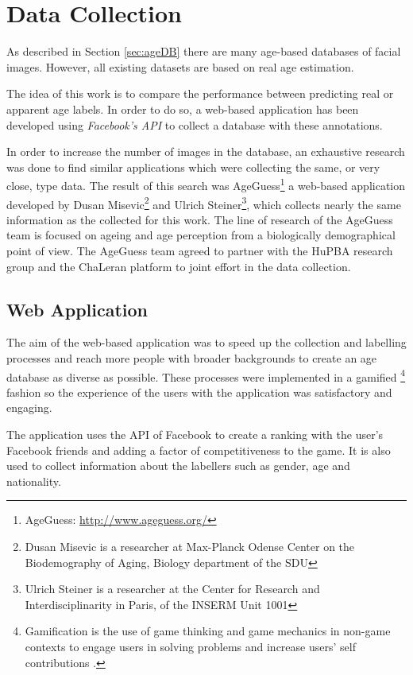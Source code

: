 \chapter{Data Collection} \label{chap:data}

As described in Section \ref{sec:ageDB} there are many age-based databases of facial images. However, all existing datasets are based on real age estimation. 

The idea of this work is to compare the performance between predicting real or apparent age labels. In order to do so, a web-based application has been developed using \textit{Facebook's API} to collect a database with these annotations. 

In order to increase the number of images in the database, an exhaustive research was done to find similar applications which were collecting the same, or very close, type data. The result of this search was AgeGuess\footnote{AgeGuess: \url{http://www.ageguess.org/}} a web-based application developed by Dusan Misevic\footnote{Dusan Misevic is a researcher at Max-Planck Odense Center on the Biodemography of Aging, Biology department of the SDU} and 
Ulrich Steiner\footnote{Ulrich Steiner is a researcher at the Center for Research and Interdisciplinarity in Paris, of the INSERM Unit 1001}, which collects nearly the same information as the collected for this work. The line of research of the AgeGuess team is focused on ageing and age perception from a biologically demographical point of view. The AgeGuess team agreed to partner with the HuPBA research group and the ChaLeran platform to joint effort in the data collection.

\section{Web Application}\label{sec:web}

The aim of the web-based application was to speed up the collection and labelling processes and reach more people with broader backgrounds to create an age database as diverse as possible. These processes were implemented in a gamified \footnote{Gamification is the use of game thinking and game mechanics in non-game contexts to engage users in solving problems and increase users' self contributions \cite{Deterding:2011:GDE:2181037.2181040}.} fashion so the experience of the users with the application was satisfactory and engaging. 

The application uses the API of Facebook to create a ranking with the user's Facebook friends and adding a factor of competitiveness to the game. It is also used to collect information about the labellers such as gender, age and nationality.

